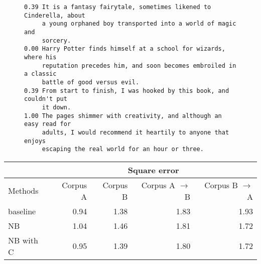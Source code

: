 \documentclass[japanese]{jnlp_1.3d}
\begin{document}
\begin{figure}[t]
\begin{center}
\vspace{\baselineskip}
\begin{minipage}{340pt}
\begin{verbatim}
0.39 It is a fantasy fairytale, sometimes likened to Cinderella, about 
     a young orphaned boy transported into a world of magic and 
     sorcery. 
0.00 Harry Potter finds himself at a school for wizards, where his 
     reputation precedes him, and soon becomes embroiled in a classic
     battle of good versus evil. 
0.39 From start to finish, I was hooked by this book, and couldn't put
     it down. 
1.00 The pages shimmer with creativity, and although an easy read for
     adults, I would recommend it heartily to anyone that enjoys
     escaping the real world for an hour or three.
\end{verbatim}
\end{minipage}
\end{center}
\vspace{9pt}
\label{fig:subsen}
\end{figure}
\begin{table}[t]
	\label{tab:sub2}
	  \begin{center}
	  \begin{tabular}{|l|r|r|r|r|} \hline
		                      
		& \multicolumn{4}{|c|}{Square error}\\ \hline
 Methods   & Corpus A & Corpus B & Corpus A $\to$ B & Corpus B $\to$ A\\ \hline
 baseline  & 0.94     & 1.38     & 1.83             & 1.93     \\
 NB        & 1.04     & 1.46     & 1.81             & 1.72     \\
 NB with C & 0.95     & 1.39     & 1.80             & 1.72     \\ \hline
  \end{tabular}
  \end{center}
\end{table}
\end{document}
